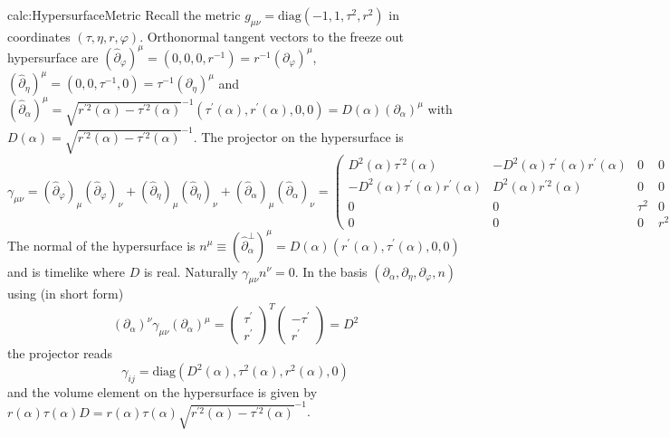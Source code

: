 \begin{calc}{calc:HypersurfaceMetric}
    Recall the metric $g_{\mu\nu}=\text{diag}(-1,1,\tau^2,r^2)$ in coordinates $(\tau,\eta,r,\varphi)$. Orthonormal tangent vectors to the freeze out hypersurface are $(\hat\partial_\varphi)^\mu=(0,0,0,r^{-1})=r^{-1}(\partial_\varphi)^\mu$, $(\hat\partial_\eta)^\mu=(0,0,\tau^{-1},0)=\tau^{-1}(\partial_\eta)^\mu$ and $(\hat\partial_\alpha)^\mu=\sqrt{r^{\prime 2}(\alpha)-\tau^{\prime 2}(\alpha)}^{-1}(\tau^{\prime}(\alpha),r^{\prime}(\alpha),0,0)=D(\alpha)(\partial_\alpha)^\mu$ with $D(\alpha)=\sqrt{r^{\prime 2}(\alpha)-\tau^{\prime 2}(\alpha)}^{-1}$. The projector on the hypersurface is
    \begin{equation}
        \gamma_{\mu\nu}=(\hat\partial_\varphi)_\mu(\hat\partial_\varphi)_\nu+(\hat\partial_\eta)_\mu(\hat\partial_\eta)_\nu+(\hat\partial_\alpha)_\mu(\hat\partial_\alpha)_\nu=\begin{pmatrix}
            D^2(\alpha)\tau^{\prime2}(\alpha)               & -D^2(\alpha)\tau^\prime(\alpha)r^\prime(\alpha) & 0      & 0   \\
            -D^2(\alpha)\tau^\prime(\alpha)r^\prime(\alpha) & D^2(\alpha)r^{\prime2}(\alpha)                  & 0      & 0   \\
            0                                               & 0                                               & \tau^2 & 0   \\
            0                                               & 0                                               & 0      & r^2
        \end{pmatrix}
    \end{equation}
    The normal of the hypersurface is $n^\mu\equiv(\hat\partial_\alpha^\perp)^\mu=D(\alpha)(r^\prime(\alpha),\tau^\prime(\alpha),0,0)$ and is timelike where $D$ is real. Naturally $\gamma_{\mu\nu}n^\nu=0$. In the basis $(\partial_\alpha,\partial_\eta,\partial_\varphi,n)$ using (in short form)
    \begin{equation}
        (\partial_\alpha)^\nu\gamma_{\mu\nu}(\partial_\alpha)^\mu=\begin{pmatrix}
            \tau^\prime \\r^\prime
        \end{pmatrix}^T\begin{pmatrix}
            -\tau^\prime \\
            r^\prime
        \end{pmatrix}=D^2
    \end{equation}
    the projector reads
    \begin{equation}
        \gamma_{ij}=\text{diag}(D^2(\alpha),\tau^2(\alpha),r^2(\alpha),0)
    \end{equation}
    and the volume element on the hypersurface is given by $r(\alpha)\tau(\alpha) D=r(\alpha)\tau(\alpha)\sqrt{r^{\prime 2}(\alpha)-\tau^{\prime 2}(\alpha)}^{-1}$.
\end{calc}

